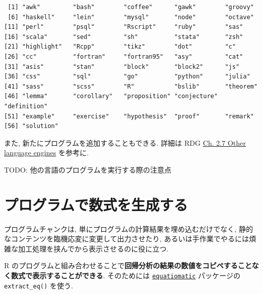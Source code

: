 \documentclass[
  xelatex,ja=standard,jafont=noto]{bxjsbook}
\newenvironment{Shaded}{\begin{snugshade}}{\end{snugshade}}
\newcommand{\FunctionTok}[1]{\textcolor[rgb]{0.00,0.00,0.00}{#1}}
\newcommand{\NormalTok}[1]{#1}
\newcommand{\SpecialCharTok}[1]{\textcolor[rgb]{0.00,0.00,0.00}{#1}}
\theoremstyle{definition}
\theoremstyle{definition}
\theoremstyle{definition}
\theoremstyle{definition}
\theoremstyle{remark}
\begin{document}
\begin{Shaded}
\end{Shaded}

\begin{verbatim}
 [1] "awk"         "bash"        "coffee"      "gawk"        "groovy"     
 [6] "haskell"     "lein"        "mysql"       "node"        "octave"     
[11] "perl"        "psql"        "Rscript"     "ruby"        "sas"        
[16] "scala"       "sed"         "sh"          "stata"       "zsh"        
[21] "highlight"   "Rcpp"        "tikz"        "dot"         "c"          
[26] "cc"          "fortran"     "fortran95"   "asy"         "cat"        
[31] "asis"        "stan"        "block"       "block2"      "js"         
[36] "css"         "sql"         "go"          "python"      "julia"      
[41] "sass"        "scss"        "R"           "bslib"       "theorem"    
[46] "lemma"       "corollary"   "proposition" "conjecture"  "definition" 
[51] "example"     "exercise"    "hypothesis"  "proof"       "remark"     
[56] "solution"   
\end{verbatim}

また, 新たにプログラムを追加することもできる. 詳細は RDG
\href{https://bookdown.org/yihui/rmarkdown/language-engines.html}{Ch.
2.7 Other language engines} を参考に.

TODO: 他の言語のプログラムを実行する際の注意点

\hypertarget{ux30d7ux30edux30b0ux30e9ux30e0ux3067ux6570ux5f0fux3092ux751fux6210ux3059ux308b}{%
\section{プログラムで数式を生成する}\label{ux30d7ux30edux30b0ux30e9ux30e0ux3067ux6570ux5f0fux3092ux751fux6210ux3059ux308b}}

プログラムチャンクは, 単にプログラムの計算結果を埋め込むだけでなく,
静的なコンテンツを臨機応変に変更して出力させたり,
あるいは手作業でやるには煩雑な加工処理を挟んでから表示させるのに役に立つ.

R
のプログラムと組み合わせることで\textbf{回帰分析の結果の数値をコピペすることなく数式で表示することができる}.
そのためには
\href{https://github.com/datalorax/equatiomatic}{\texttt{equatiomatic}}
パッケージの \texttt{extract\_eq()} を使う.
\end{document}
